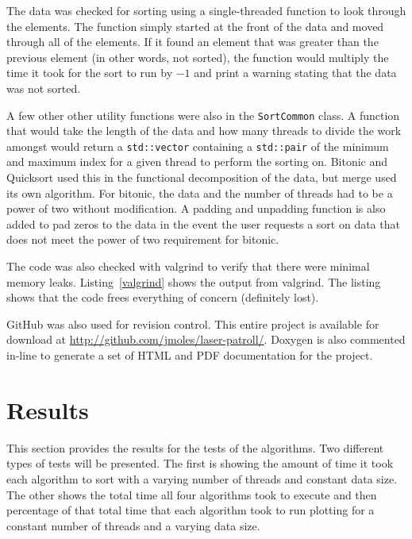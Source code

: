 \documentclass[journal]{IEEEtran}
\newcommand{\bashout}[2]{
\begin{figure}

\end{figure}
}
\begin{document}
The data was checked for sorting using a single-threaded function to look through the elements. The function simply started at the front of the data and moved through all of the elements. If it found an element that was greater than the previous element (in other words, not sorted), the function would multiply the time it took for the sort to run by $-1$ and print a warning stating that the data was not sorted.

A few other other utility functions were also in the \texttt{SortCommon} class. A function that would take the length of the data and how many threads to divide the work amongst would return a \texttt{std::vector} containing a \texttt{std::pair} of the minimum and maximum index for a given thread to perform the sorting on. Bitonic and Quicksort used this in the functional decomposition of the data, but merge used its own algorithm. For bitonic, the data and the number of threads had to be a power of two without modification. A padding and unpadding function is also added to pad zeros to the data in the event the user requests a sort on data that does not meet the power of two requirement for bitonic.

The code was also checked with valgrind to verify that there were minimal memory leaks. Listing~\ref{valgrind} shows the output from valgrind. The listing shows that the code frees everything of concern (definitely lost).

\bashout{valgrind}{Valgrind Output}

GitHub was also used for revision control. This entire project is available for download at \url{http://github.com/jmoles/laser-patroll/}. Doxygen is also commented in-line to generate a set of HTML and PDF documentation for the project.



\section{Results}
\label{sec:results}



This section provides the results for the tests of the algorithms. Two different types of tests will be presented. The first is showing the amount of time it took each algorithm to sort with a varying number of threads and constant data size. The other shows the total time all four algorithms took to execute and then percentage of that total time that each algorithm took to run plotting for a constant number of threads and a varying data size.
\end{document}
